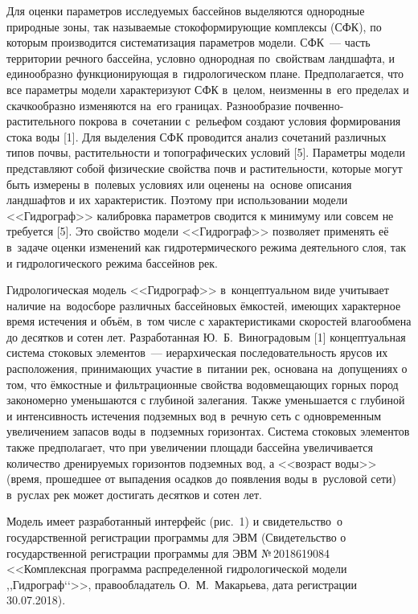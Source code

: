 Для оценки параметров исследуемых бассейнов выделяются однородные природные зоны, так называемые стокоформирующие комплексы (СФК), по которым производится систематизация параметров модели. СФК~--- часть территории речного бассейна, условно однородная по~свойствам ландшафта, и единообразно функционирующая в~гидрологическом плане. Предполагается, что все параметры модели характеризуют СФК в~целом, неизменны в~его пределах и скачкообразно изменяются на~его границах. Разнообразие почвенно-растительного покрова в~сочетании с~рельефом создают условия формирования стока воды [1]. Для выделения СФК проводится анализ сочетаний различных типов почвы, растительности и топографических условий [5]. Параметры модели представляют собой физические свойства почв и растительности, которые могут быть измерены в~полевых условиях или оценены на~основе описания ландшафтов и их характеристик. Поэтому при использовании модели <<Гидрограф>> калибровка параметров сводится к минимуму или совсем не требуется [5]. Это свойство модели <<Гидрограф>> позволяет применять её в~задаче оценки изменений как гидротермического режима деятельного слоя, так и гидрологического режима бассейнов рек.




Гидрологическая модель <<Гидрограф>> в~концептуальном виде учитывает наличие на~водосборе различных бассейновых ёмкостей, имеющих характерное время истечения и объём, в~том числе с характеристиками скоростей влагообмена до десятков и сотен лет. Разработанная Ю.~Б.~Виноградовым [1] концептуальная система стоковых элементов~--- иерархическая последовательность ярусов их расположения, принимающих участие в~питании рек, основана на~допущениях о том, что ёмкостные и фильтрационные свойства водовмещающих горных пород закономерно уменьшаются с глубиной залегания. Также уменьшается с глубиной и интенсивность истечения подземных вод в~речную сеть с одновременным увеличением запасов воды в~подземных горизонтах. Система стоковых элементов также предполагает, что при увеличении площади бассейна увеличивается количество дренируемых горизонтов подземных вод, а <<возраст воды>> (время, прошедшее от выпадения осадков до появления воды в~русловой сети) в~руслах рек может достигать десятков и сотен лет.

Модель имеет разработанный интерфейс (рис.~1) и свидетельство о государственной регистрации программы для ЭВМ (Свидетельство о государственной регистрации программы для ЭВМ №\,2018619084 <<Комплексная программа распределенной гидрологической модели ,,Гидрограф‘‘>>, правообладатель О.~М.~Макарьева, дата регистрации 30.07.2018).

